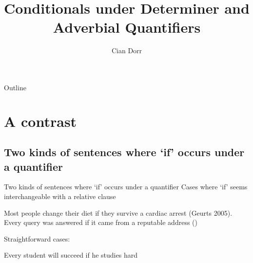 \documentclass[xcolor=table, leqno]{beamer}
\title%
{Conditionals under Determiner and Adverbial Quantifiers}
\author%
{Cian Dorr}
\institute[NYU] %
{
  Department of Philosophy\\
  New York University
}
\date%
{\date / Talk for Harvey's seminar}
\begin{document}
\setlength{\parskip}{0.3\baselineskip}
\setlength{\topsep}{0in}
\setlength{\itemsep}{0in}

\begin{frame}
  \titlepage
\end{frame}

\begin{frame}{Outline}
  \tableofcontents
\end{frame}


\section{A contrast}
\subsection{Two kinds of sentences where ‘if’ occurs under a quantifier}
\begin{frame}{Two kinds of sentences where ‘if’ occurs under a quantifier}
Cases where ‘if’ seems interchangeable with a relative clause
\begin{prop}
	\nitem
	Most people change their diet if they survive a cardiac arrest (Geurts 2005).
	\nitem
	Every query was answered if it came from a reputable address ()
\end{prop}




Straightforward cases:
\begin{prop}
	\nitem
	Every student will succeed if he studies hard
	\nitem
	
\end{prop}




\end{frame}
\end{document}
